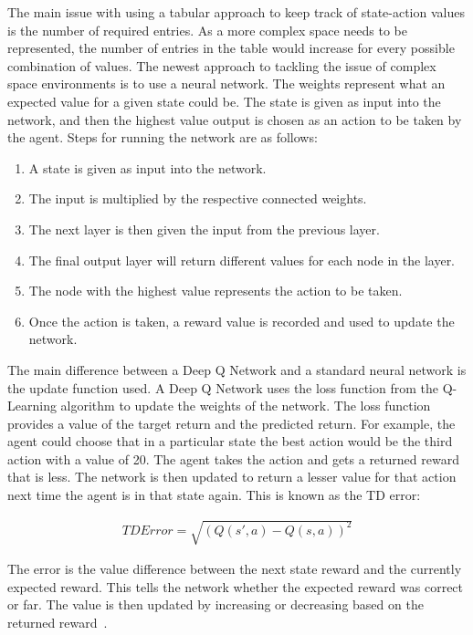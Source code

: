 The main issue with using a tabular approach to keep track of state-action
values is the number of required entries. As a more complex space needs to be
represented, the number of entries in the table would increase for every
possible combination of values. The newest approach to tackling the issue of
complex space environments is to use a neural network. The weights represent
what an expected value for a given state could be. The state is given as input
into the network, and then the highest value output is chosen as an action to be
taken by the agent. Steps for running the network are as follows:

\begin{enumerate}
    \item A state is given as input into the network.
    \item The input is multiplied by the respective connected weights.
    \item The next layer is then given the input from the previous layer.
    \item The final output layer will return different values for each node in
        the layer.
    \item The node with the highest value represents the action to be taken.
    \item Once the action is taken, a reward value is recorded and used to
        update the network.
\end{enumerate}

The main difference between a Deep Q Network and a standard neural network is
the update function used. A Deep Q Network uses the loss function from the
Q-Learning algorithm to update the weights of the network. The loss function
provides a value of the target return and the predicted return. For example, the
agent could choose that in a particular state the best action would be the third
action with a value of 20. The agent takes the action and gets a returned reward
that is less. The network is then updated to return a lesser value for that
action next time the agent is in that state again. This is known as the TD
error:

\begin{align}
    TD Error = \sqrt{{(Q(s',a) - Q(s,a))}^{2}}
\end{align}

The error is the value difference between the next state reward and the
currently expected reward. This tells the network whether the expected reward
was correct or far. The value is then updated by increasing or decreasing based
on the returned reward~\cite{pandey2010reinforcement}.

